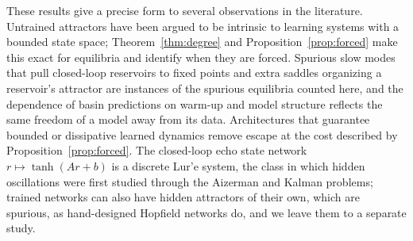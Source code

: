 \documentclass[aip,cha,reprint,amsmath,amssymb,longbibliography]{revtex4-2}
\theoremstyle{definition}
\begin{document}
These results give a precise form to several observations in the literature. Untrained attractors have been argued to be
intrinsic to learning systems with a bounded state space;\cite{OHagan2025Confabulation} Theorem~\ref{thm:degree} and
Proposition~\ref{prop:forced} make this exact for equilibria and identify when they are forced. Spurious slow modes that
pull closed-loop reservoirs to fixed points\cite{Oishi2026FastSlow} and extra saddles organizing a reservoir's
attractor\cite{Kabayama2025PseudoLorenz} are instances of the spurious equilibria counted here, and the dependence of basin
predictions on warm-up and model structure\cite{ZhangCornelius2023} reflects the same freedom of a model away from its data.
Architectures that guarantee bounded or dissipative learned
dynamics\cite{Kaptanoglu2021Trapping,Linot2023Stabilized,Tang2026Dissipative} remove escape at the cost described by
Proposition~\ref{prop:forced}. The closed-loop echo state network $r\mapsto\tanh(Ar+b)$ is a discrete Lur'e system, the class
in which hidden oscillations were first studied through the Aizerman and Kalman
problems;\cite{LeonovKuznetsov2013,Kuznetsov2019KalmanHidden} trained networks can also have hidden attractors of their own,
which are spurious, as hand-designed Hopfield networks do,\cite{DancaKuznetsov2017Hopfield} and we leave them to a separate
study.
\end{document}

